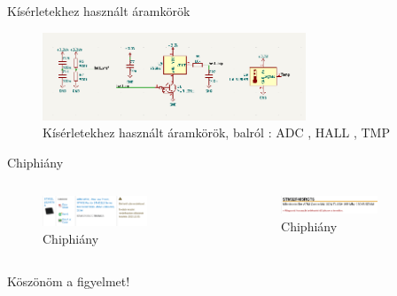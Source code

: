 \documentclass[aspectratio=169,xcolor=dvipsnames]{beamer}
\begin{document}
\begin{frame}{Kísérletekhez használt áramkörök}

	\begin{figure}[h]
		\centering
		\includegraphics[width=0.7\textwidth]{kiserletek}
		\caption{Kísérletekhez használt áramkörök, balról : ADC , HALL , TMP}
		\end{figure}

	\end{frame}

\begin{frame}{Chiphiány}
	\begin{columns}[c]

			\begin{figure}[h]
				\centering
			\includegraphics[width=0.7\textwidth]{chip1}
				\caption{Chiphiány}
			\end{figure}

		\begin{figure}[h]
		\centering
			\includegraphics[width=0.7\textwidth]{chip2}
			
		\caption{Chiphiány}
		\end{figure}
	\end{columns}

\end{frame}



\begin{frame}
    \Huge{\centerline{Köszönöm a figyelmet!}}
\end{frame}
\end{document}
